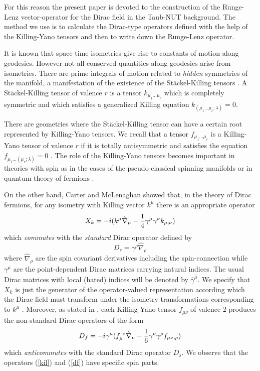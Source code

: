 \documentclass[a4paper,12pt]{article}
\begin{document}
For this reason the present paper is devoted to the construction of the 
Runge-Lenz vector-operator for the  Dirac field in the 
Taub-NUT background. The method we use is to calculate the Dirac-type 
operators defined with the help of the  Killing-Yano tensors and then to 
write down the Runge-Lenz operator.    

It is known that space-time isometries give rise to constants of motion 
along geodesics. However not all conserved quantities along geodesics 
arise from isometries. There are prime integrals of motion  related to 
{\em hidden} symmetries of the manifold, a manifestation of the existence 
of the St\" ackel-Killing tensors \cite{Ca1,CRGH}.
A St\" ackel-Killing tensor of valence $r$ is a tensor $k_{\mu_1...\mu_r}$  
which is completely symmetric and which satisfies a generalized Killing 
equation $k_{(\mu_1...\mu_r;\lambda)} = 0$. 

There are geometries where the St\" ackel-Killing tensor can have a certain 
root represented by Killing-Yano tensors. We recall that a tensor 
$f_{\mu_1...\mu_r}$ is a Killing-Yano tensor of valence $r$  if it is totally 
antisymmetric and  satisfies the equation 
$f_{\mu_1...(\mu_r;\lambda)} = 0$ \cite{Ya}.
The role of the Killing-Yano tensors becomes important in theories with spin
as in the cases of the pseudo-classical  spinning manifolds \cite{BM,GRH} 
or in quantum theory of fermions \cite{CV2}. 


On the other hand, Carter and McLenaghan \cite{CML} showed that, in the theory 
of Dirac fermions, for any isometry with Killing vector $k^\mu$ there is an 
appropriate operator 
\begin{equation}\label{kil}
X_k = -i ( k^\mu \hat\nabla_\mu - {1\over 4} \gamma^\mu \gamma^\nu 
k_{\mu;\nu})
\end{equation}
which {\em commutes}  with the  {\em standard} Dirac operator 
defined by
\begin{equation}\label{ds}
D_s = \gamma^\rho \hat\nabla_\rho
\end{equation}
where $\hat\nabla_\rho$ are the spin covariant derivatives including the  
spin-con\-nec\-ti\-on while $\gamma^\mu$ are the point-dependent  Dirac 
matrices carrying natural indices. The usual Dirac matrices with local 
(hated) indices will be denoted by $\hat\gamma^{\hat\mu}$. We specify that
$X_{k}$ is just the generator of the 
operator-valued representation according which the Dirac field must transform 
under the isometry transformations corresponding to $k^{\mu}$ \cite{ES}. 
Moreover, as stated in \cite{CML}, each Killing-Yano tensor $f_{\mu\nu}$ 
of valence 2 produces the non-standard Dirac operators of the form 
\begin{equation}\label{df}
D_f = -i\gamma^\mu (f_\mu ^{~\nu}\hat\nabla_\nu  - 
{1\over 6}\gamma^\nu 
\gamma^\rho f_{\mu\nu;\rho})
\end{equation}
which {\em anticommutes} with the standard Dirac operator $D_s$. We observe 
that the operators (\ref{kil}) and (\ref{df}) have specific spin parts. 
\end{document}
